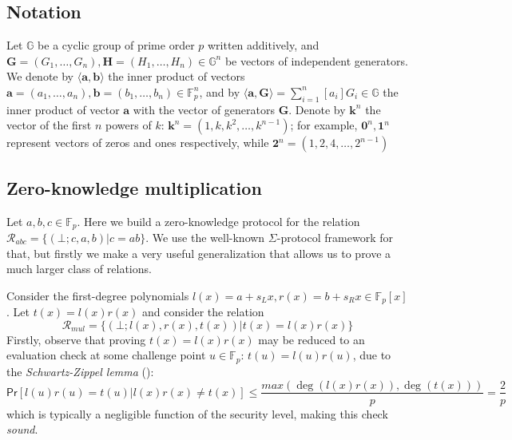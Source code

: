 \documentclass[../lecture-notes-148x210.tex]{subfiles}
\begin{document}
\subsection{Notation}
Let $\mathbb{G}$ be a cyclic group of prime order $p$ written additively, and $\mathbf{G} = (G_1, \dots, G_n), \mathbf{H} = (H_1, \dots, H_n) \in \mathbb{G}^n$ be vectors of independent generators. We denote by $\langle \mathbf{a,b} \rangle$ the inner product of vectors $\mathbf{a} = (a_1, \dots, a_n), \mathbf{b} = (b_1, \dots, b_n) \in \mathbb{F}_p^n$, and by $\langle \mathbf{a,G} \rangle = \sum_{i=1}^n [a_i] G_i \in \mathbb{G}$ the inner product of vector $\mathbf{a}$ with the vector of generators $\mathbf{G}$. Denote by $\mathbf{k}^n$ the vector of the first $n$ powers of $k$: $\mathbf{k}^n = (1, k, k^2, \dots, k^{n-1})$; for example, $\mathbf{0}^n, \mathbf{1}^n$ represent vectors of zeros and ones respectively, while $\mathbf{2}^{n} = (1, 2, 4, \dots, 2^{n-1})$

\subsection{Zero-knowledge multiplication}
Let $a,b,c \in \mathbb{F}_p$. Here we build a zero-knowledge protocol for the relation $\mathcal{R}_{abc} = \{ (\bot;c,a,b) \vert c=ab \}$. We use the well-known $\Sigma$-protocol framework for that, but firstly we make a very useful generalization that allows us to prove a much larger class of relations.

Consider the first-degree polynomials $l(x) = a + s_L x, r(x) = b + s_R x \in \mathbb{F}_p[x]$. Let $t(x) = l(x)r(x)$ and consider the relation
$$\mathcal{R}_{mul} = \{ (\bot;l(x),r(x),t(x)) \vert t(x) = l(x)r(x)\}$$
Firstly, observe that proving $t(x) = l(x)r(x)$ may be reduced to an evaluation check at some challenge point $u \in \mathbb{F}_p$: $t(u) = l(u)r(u)$, due to the \textit{Schwartz-Zippel lemma} ():
$$\mathsf{Pr}[l(u)r(u) = t(u) \vert l(x)r(x) \neq t(x)] \le \frac{max(\deg(l(x)r(x)), \deg(t(x)))}{p} = \frac{2}{p}$$
which is typically a negligible function of the security level, making this check \textit{sound}.
\end{document}
